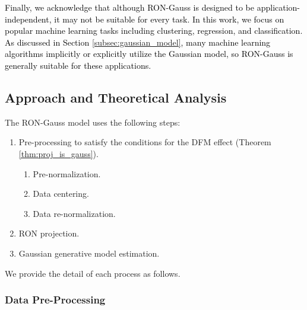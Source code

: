 \documentclass[USenglish,oneside,twocolumn]{article}
\theoremstyle{definition}
\theoremstyle{remark}
\theoremstyle{plain}
\theoremstyle{plain}
\newcommand{\chang}{\textcolor{black}}
\begin{document}
\chang{Finally, we acknowledge that although RON-Gauss is designed to be application-independent, it may not be suitable for every task. In this work, we focus on popular machine learning tasks including clustering, regression, and classification. As discussed in Section \ref{subsec:gaussian_model}, many machine learning algorithms implicitly or explicitly utilize the Gaussian model, so RON-Gauss is generally suitable for these applications.
}

\vspace{-1em}
\subsection{Approach and Theoretical Analysis\label{subsec:Theoretical-Basis}}

The RON-Gauss model uses the following steps:
\begin{enumerate}
\item Pre-processing to satisfy the conditions for the DFM effect (Theorem
\ref{thm:proj_is_gauss}).
\begin{enumerate}
\item Pre-normalization.
\item Data centering.
\item Data re-normalization.
\end{enumerate}
\item RON projection.
\item Gaussian generative model estimation.
\end{enumerate}
\vspace{-1em}
We provide the detail of each process as follows.

\vspace{-1em}
\subsubsection{Data Pre-Processing}
\end{document}
